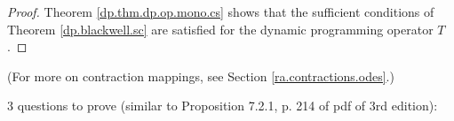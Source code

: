 \begin{proof}

Theorem \ref{dp.thm.dp.op.mono.cs} shows that the sufficient conditions of Theorem \ref{dp.blackwell.sc} are satisfied for the dynamic programming operator \(T\).

%
%
%

\end{proof}

(For more on contraction mappings, see Section \ref{ra.contractions.odes}.)

3 questions to prove (similar to Proposition 7.2.1, p. 214 of pdf of 3rd edition):

